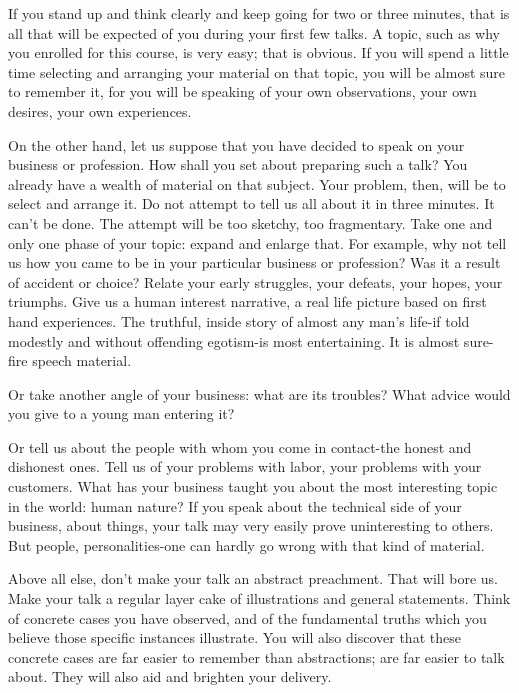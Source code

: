 \documentclass[10pt]{article}
\begin{document}
If you stand up and think clearly and keep going for two or three minutes, that is all that will be expected of you during your first few talks. A topic, such as why you enrolled for this course, is very easy; that is obvious. If you will spend a little time selecting and arranging your material on that topic, you will be almost sure to remember it, for you will be speaking of your own observations, your own desires, your own experiences.

On the other hand, let us suppose that you have decided to speak on your business or profession. How shall you set about preparing such a talk? You already have a wealth of material on that subject. Your problem, then, will be to select and arrange it. Do not attempt to tell us all about it in three minutes. It can't be done. The attempt will be too sketchy, too fragmentary. Take one and only one phase of your topic: expand and enlarge that. For example, why not tell us how you came to be in your particular business or profession? Was it a result of accident or choice? Relate your early struggles, your defeats, your hopes, your triumphs. Give us a human interest narrative, a real life picture based on first hand experiences. The truthful, inside story of almost any man's life-if told modestly and without offending egotism-is most entertaining. It is almost sure-fire speech material.

Or take another angle of your business: what are its troubles? What advice would you give to a young man entering it?

Or tell us about the people with whom you come in contact-the honest and dishonest ones. Tell us of your problems with labor, your problems with your customers. What has your business taught you about the most interesting topic in the world: human nature? If you speak about the technical side of your business, about things, your talk may very easily prove uninteresting to others. But people, personalities-one can hardly go wrong with that kind of material.

Above all else, don't make your talk an abstract preachment. That will bore us. Make your talk a regular layer cake of illustrations and general statements. Think of concrete cases you have observed, and of the fundamental truths which you believe those specific instances illustrate. You will also discover that these concrete cases are far easier to remember than abstractions; are far easier to talk about. They will also aid and brighten your delivery.
\end{document}
